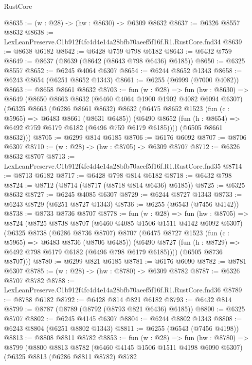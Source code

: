 \begin{lexlean}{RustCore}
\begin{coremodule}
@8635 := (w : @28) -> (hw : @8630) -> @6309 @8632
@8637 := @6326 @8557 @8632
@8638 := LexLeanPreserve.C1b912f4fc4d4e14a28bfb70aeef5f16f.R1.RustCore.fnd34
@8639 := @8638 @6182
@8642 := @6428 @759 @798 @6182
@8643 := @6432 @759
@8649 := @8637 (@8639 (@8642 (@8643 @798 @6436) @6185))
@8650 := @6325 @8557
@8652 := @6245 @4064 @6307
@8654 := @6244 @8652 @1343
@8658 := @6243 @8654 (@6251 @8652 @1343)
@8661 := @6255 (@6999 (@7000 @4082))
@8663 := @8658 @8661 @8632
@8703 := fun (w : @28) =>
  fun (hw : @8630) =>
  @8649
    (@8650
      @8663
      @8632
      (@6460 @4064 @1900 @1902 @4082 @6094 @6307)
      (@6325
        @8663
        (@6286 @8661 @8632)
        @8632
        (@6475
          @8652
          @1523
          (fun (c : @5965) => @6483 @8661 (@8631 @6485))
          (@6490 @8652 (fun (h : @8654) => @6492 @759 @6179 @6182 (@6496 @759 @6179 @6185))))
        (@6505 @8661 @8632)))
@8705 := @6299 @814 @6185
@8706 := @6176 @6092
@8707 := @8706 @6307
@8710 := (w : @28) -> (hw : @8705) -> @6309 @8707
@8712 := @6326 @8632 @8707
@8713 := LexLeanPreserve.C1b912f4fc4d4e14a28bfb70aeef5f16f.R1.RustCore.fnd35
@8714 := @8713 @6182
@8717 := @6428 @798 @814 @6182
@8718 := @6432 @798
@8724 := @8712 (@8714 (@8717 (@8718 @814 @6436) @6185))
@8725 := @6325 @8632
@8727 := @6245 @4085 @6307
@8729 := @6244 @8727 @1343
@8733 := @6243 @8729 (@6251 @8727 @1343)
@8736 := @6255 (@6543 (@7456 @4142))
@8738 := @8733 @8736 @8707
@8778 := fun (w : @28) =>
  fun (hw : @8705) =>
  @8724
    (@8725
      @8738
      @8707
      (@6460 @4085 @1506 @1511 @4142 @6092 @6307)
      (@6325
        @8738
        (@6286 @8736 @8707)
        @8707
        (@6475
          @8727
          @1523
          (fun (c : @5965) => @6483 @8736 (@8706 @6485))
          (@6490 @8727 (fun (h : @8729) => @6492 @798 @6179 @6182 (@6496 @798 @6179 @6185))))
        (@6505 @8736 @8707)))
@8780 := @6299 @821 @6185
@8781 := @6176 @6090
@8782 := @8781 @6307
@8785 := (w : @28) -> (hw : @8780) -> @6309 @8782
@8787 := @6326 @8707 @8782
@8788 := LexLeanPreserve.C1b912f4fc4d4e14a28bfb70aeef5f16f.R1.RustCore.fnd36
@8789 := @8788 @6182
@8792 := @6428 @814 @821 @6182
@8793 := @6432 @814
@8799 := @8787 (@8789 (@8792 (@8793 @821 @6436) @6185))
@8800 := @6325 @8707
@8802 := @6245 @4145 @6307
@8804 := @6244 @8802 @1343
@8808 := @6243 @8804 (@6251 @8802 @1343)
@8811 := @6255 (@6543 (@7456 @4198))
@8813 := @8808 @8811 @8782
@8853 := fun (w : @28) =>
  fun (hw : @8780) =>
  @8799
    (@8800
      @8813
      @8782
      (@6460 @4145 @1506 @1511 @4198 @6090 @6307)
      (@6325
        @8813
        (@6286 @8811 @8782)
        @8782

\end{coremodule}
\end{lexlean}
